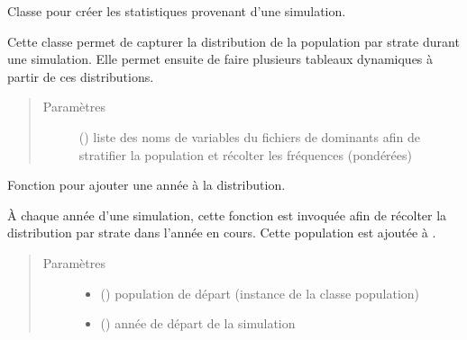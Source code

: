 \documentclass[letterpaper,10pt,french]{sphinxmanual}
\begin{document}
\begin{fulllineitems}
\label{\detokenize{code:simgen.statistics}}
Classe pour créer les statistiques provenant d’une simulation.

Cette classe permet de capturer la distribution de la population par strate durant une simulation. Elle permet ensuite de faire plusieurs tableaux dynamiques à partir de ces distributions.
\begin{quote}\begin{description}
\item[{Paramètres}] \leavevmode
{} () \textendash{} liste des noms de variables du fichiers de dominants afin de stratifier la population et récolter les fréquences (pondérées)

\end{description}\end{quote}

\begin{fulllineitems}
\label{\detokenize{code:simgen.statistics.add}}
Fonction pour ajouter une année à la distribution.

À chaque année d’une simulation, cette fonction est invoquée afin de récolter la distribution par strate dans l’année en cours. Cette population est ajoutée à .
\begin{quote}\begin{description}
\item[{Paramètres}] \leavevmode\begin{itemize}
\item {} 
 ({\hyperref[\detokenize{code:simgen.population}]{}}) \textendash{} population de départ (instance de la classe population)

\item {} 
 () \textendash{} année de départ de la simulation

\end{itemize}


\end{description}
\end{quote}
\end{fulllineitems}
\end{fulllineitems}
\end{document}
